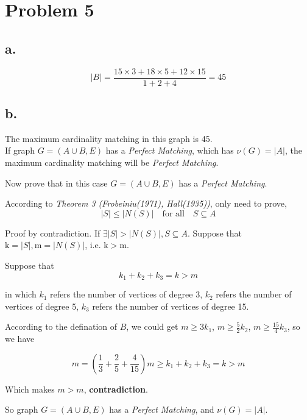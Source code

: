 \documentclass{article}
\begin{document}
\section*{Problem 5}{
    \subsection*{a.}{
        \[\lvert \mathit{B} \rvert = \mathrm{\frac{15 \times 3 + 18 \times 5 + 12 \times 15}{1+2+4} = 45}\]
    }
    \subsection*{b.}{
        The maximum cardinality matching in this graph is 45. \\

        If graph \( \mathit{G} = (\mathit{A} \cup \mathit{B}, \mathit{E})\) has a \textit{Perfect Matching}, which has \(\nu (\mathit{G}) = \lvert \mathit{A} \rvert\), the maximum cardinality matching will be \textit{Perfect Matching}. 

        Now prove that in this case \( \mathit{G} = (\mathit{A} \cup \mathit{B}, \mathit{E})\) has a \textit{Perfect Matching}.

        According to \textit{Theorem 3 (Frobeiniu(1971), Hall(1935))}, only need to prove, 
        \[\lvert \mathit{S} \rvert \leqslant \lvert \mathit{N(S)} \rvert \quad \text{for all} \quad \mathit{S} \subseteq \mathit{A}\]

        Proof by contradiction. If \(\exists \lvert \mathit{S} \rvert > \lvert \mathit{N(S)} \rvert, \mathit{S} \subseteq \mathit{A}\). Suppose that \(\mathrm{k} = \lvert \mathit{S} \rvert, \mathrm{m} = \lvert \mathit{N(S)} \rvert\), i.e. \(\mathrm{k} > \mathrm{m}\). 

        Suppose that \[\mathit{k}_{\mathrm{1}} + \mathit{k}_{\mathrm{2}} + \mathit{k}_{\mathrm{3}} = \mathit{k} > \mathit{m}\]

        in which \(\mathit{k}_{\mathrm{1}}\) refers the number of vertices of degree 3, \(\mathit{k}_{\mathrm{2}}\) refers the number of vertices of degree 5, \(\mathit{k}_{\mathrm{3}}\) refers the number of vertices of degree 15.

        According to the defination of \(\mathit{B}\), we could get \(\mathit{m} \geqslant \mathrm{3}\mathit{k}_{\mathrm{1}}\), \(\mathit{m} \geqslant \mathrm{\frac{5}{2}}\mathit{k}_{\mathrm{2}}\), \(\mathit{m} \geqslant \mathrm{\frac{15}{4}}\mathit{k}_{\mathrm{3}}\), so we have 

        \[\mathit{m} = \mathrm{(\frac{1}{3} + \frac{2}{5} + \frac{4}{15})}\mathit{m} \geqslant \mathit{k}_{\mathrm{1}} + \mathit{k}_{\mathrm{2}} + \mathit{k}_{\mathrm{3}} = \mathit{k} > \mathit{m}\]

        Which makes \(\mathit{m} > \mathit{m}\), \textbf{contradiction}.

        So graph \( \mathit{G} = (\mathit{A} \cup \mathit{B}, \mathit{E})\) has a \textit{Perfect Matching}, and \(\nu (\mathit{G}) = \lvert \mathit{A} \rvert\).
    }
}
\end{document}
